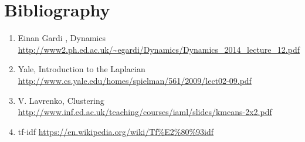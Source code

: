 \documentclass[10pt,twocolumn]{article}
\begin{document}
\section{Bibliography}
\begin{enumerate}
\item Einan Gardi , Dynamics \url{http://www2.ph.ed.ac.uk/~egardi/Dynamics/Dynamics_2014_lecture_12.pdf}
\item  Yale, Introduction to the Laplacian \url{http://www.cs.yale.edu/homes/spielman/561/2009/lect02-09.pdf}
\item V. Lavrenko, Clustering \url{http://www.inf.ed.ac.uk/teaching/courses/iaml/slides/kmeans-2x2.pdf}
\item tf-idf \url{https://en.wikipedia.org/wiki/Tf%E2%80%93idf}
\end{enumerate}
\end{document}
